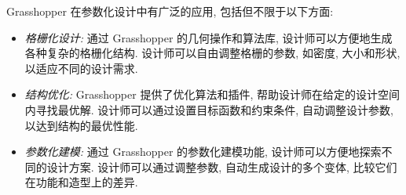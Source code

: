 Grasshopper 在参数化设计中有广泛的应用, 包括但不限于以下方面:
\begin{itemize}
  \item \emph{格栅化设计:} 通过 Grasshopper 的几何操作和算法库, 设计师可以方便地生成各种复杂的格栅化结构.
        设计师可以自由调整格栅的参数, 如密度, 大小和形状, 以适应不同的设计需求.
  \item \emph{结构优化:} Grasshopper 提供了优化算法和插件, 帮助设计师在给定的设计空间内寻找最优解.
        设计师可以通过设置目标函数和约束条件, 自动调整设计参数, 以达到结构的最优性能.
  \item \emph{参数化建模:} 通过 Grasshopper 的参数化建模功能, 设计师可以方便地探索不同的设计方案.
        设计师可以通过调整参数, 自动生成设计的多个变体, 比较它们在功能和造型上的差异.
\end{itemize}
